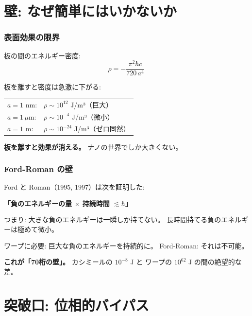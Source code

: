 \documentclass[12pt,a4paper]{article}
\begin{document}
\part{壁: なぜ簡単にはいかないか}

\section{表面効果の限界}

\begin{mathbox}[カシミールエネルギー密度]
板の間のエネルギー密度:
$$\rho = -\frac{\pi^2 \hbar c}{720 \, a^4}$$

板を離すと密度は急激に下がる:
\begin{center}
\begin{tabular}{ll}
$a = 1$ nm: & $\rho \sim 10^{12}$ J/m³（巨大） \\
$a = 1\,\mu$m: & $\rho \sim 10^{-4}$ J/m³（微小） \\
$a = 1$ m: & $\rho \sim 10^{-24}$ J/m³（ゼロ同然） \\
\end{tabular}
\end{center}

\textbf{板を離すと効果が消える。} ナノの世界でしか大きくない。
\end{mathbox}

\section{Ford-Roman の壁}

\begin{mathbox}[量子エネルギー不等式]
Ford と Roman（1995, 1997）は次を証明した:

\textbf{「負のエネルギーの量 $\times$ 持続時間 $\lesssim \hbar$」}

つまり: 大きな負のエネルギーは一瞬しか持てない。
長時間持てる負のエネルギーは極めて微小。

ワープに必要: 巨大な負のエネルギーを持続的に。
Ford-Roman: それは不可能。

\textbf{これが「70桁の壁」。} カシミールの $10^{-8}$ J と
ワープの $10^{62}$ J の間の絶望的な差。
\end{mathbox}

\part{突破口: 位相的バイパス}
\end{document}
